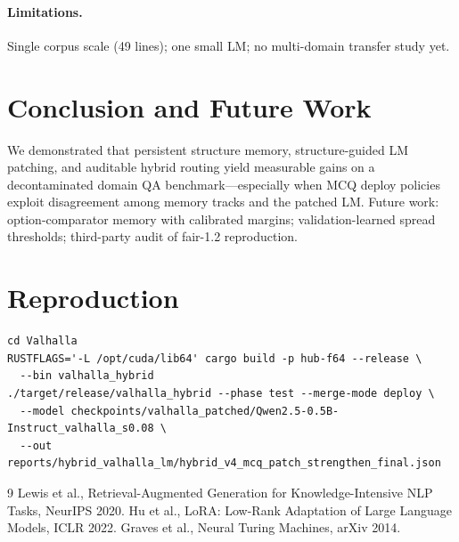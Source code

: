 \documentclass[11pt,a4paper]{article}
\begin{document}
\paragraph{Limitations.} Single corpus scale (49 lines); one small LM; no multi-domain transfer study yet.

\section{Conclusion and Future Work}
We demonstrated that persistent structure memory, structure-guided LM patching, and auditable hybrid routing yield measurable gains on a decontaminated domain QA benchmark---especially when MCQ deploy policies exploit disagreement among memory tracks and the patched LM. Future work: option-comparator memory with calibrated margins; validation-learned spread thresholds; third-party audit of fair-1.2 reproduction.

\section*{Reproduction}
\begin{verbatim}
cd Valhalla
RUSTFLAGS='-L /opt/cuda/lib64' cargo build -p hub-f64 --release \
  --bin valhalla_hybrid
./target/release/valhalla_hybrid --phase test --merge-mode deploy \
  --model checkpoints/valhalla_patched/Qwen2.5-0.5B-Instruct_valhalla_s0.08 \
  --out reports/hybrid_valhalla_lm/hybrid_v4_mcq_patch_strengthen_final.json
\end{verbatim}


\begin{thebibliography}{9}
 Lewis et al., Retrieval-Augmented Generation for Knowledge-Intensive NLP Tasks, NeurIPS 2020.
 Hu et al., LoRA: Low-Rank Adaptation of Large Language Models, ICLR 2022.
\bibitem{ntm} Graves et al., Neural Turing Machines, arXiv 2014.
\end{thebibliography}
\end{document}
